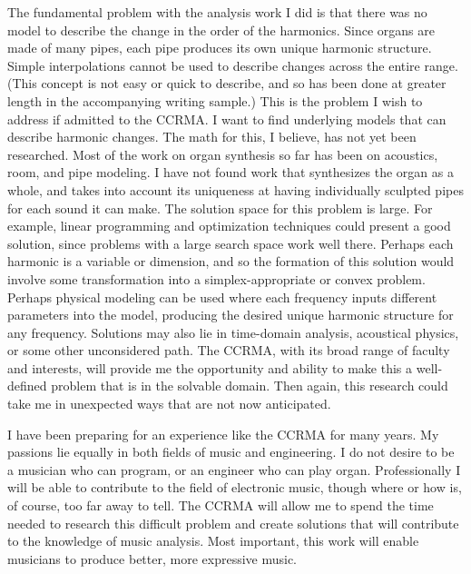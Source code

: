 \documentclass[12pt]{article}
\begin{document}
The fundamental problem with the analysis work I did is that there was no model to describe the change in the order of the harmonics. Since organs are made of many pipes, each pipe produces its own unique harmonic structure. Simple interpolations cannot be used to describe changes across the entire range. (This concept is not easy or quick to describe, and so has been done at greater length in the accompanying writing sample.) This is the problem I wish to address if admitted to the CCRMA. I want to find underlying models that can describe harmonic changes. The math for this, I believe, has not yet been researched. Most of the work on organ synthesis so far has been on acoustics, room, and pipe modeling. I have not found work that synthesizes the organ as a whole, and takes into account its uniqueness at having individually sculpted pipes for each sound it can make. The solution space for this problem is large. For example, linear programming and optimization techniques could present a good solution, since problems with a large search space work well there. Perhaps each harmonic is a variable or dimension, and so the formation of this solution would involve some transformation into a simplex-appropriate or convex problem. Perhaps physical modeling can be used where each frequency inputs different parameters into the model, producing the desired unique harmonic structure for any frequency. Solutions may also lie in time-domain analysis, acoustical physics, or some other unconsidered path. The CCRMA, with its broad range of faculty and interests, will provide me the opportunity and ability to make this a well-defined problem that is in the solvable domain. Then again, this research could take me in unexpected ways that are not now anticipated.

I have been preparing for an experience like the CCRMA for many years. My passions lie equally in both fields of music and engineering. I do not desire to be a musician who can program, or an engineer who can play organ. Professionally I will be able to contribute to the field of electronic music, though where or how is, of course, too far away to tell. The CCRMA will allow me to spend the time needed to research this difficult problem and create solutions that will contribute to the knowledge of music analysis. Most important, this work will enable musicians to produce better, more expressive music.
\end{document}
